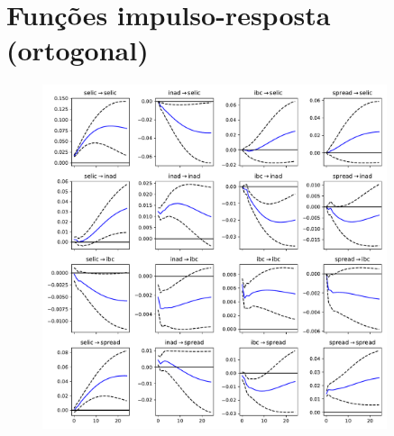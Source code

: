 \documentclass[a4paper,
               article,
               12pt,
               openany,
               oneside,
               english,
               brazil]{abntex2}
\numberwithin{equation}{section}
\begin{document}
\chapter{Funções impulso-resposta (ortogonal)}
\begin{figure}[h]
    \centering
    \includegraphics[width = 0.9\textwidth, scale=1]{irf/irf_orth_completo.pdf}
\end{figure}
\end{document}
